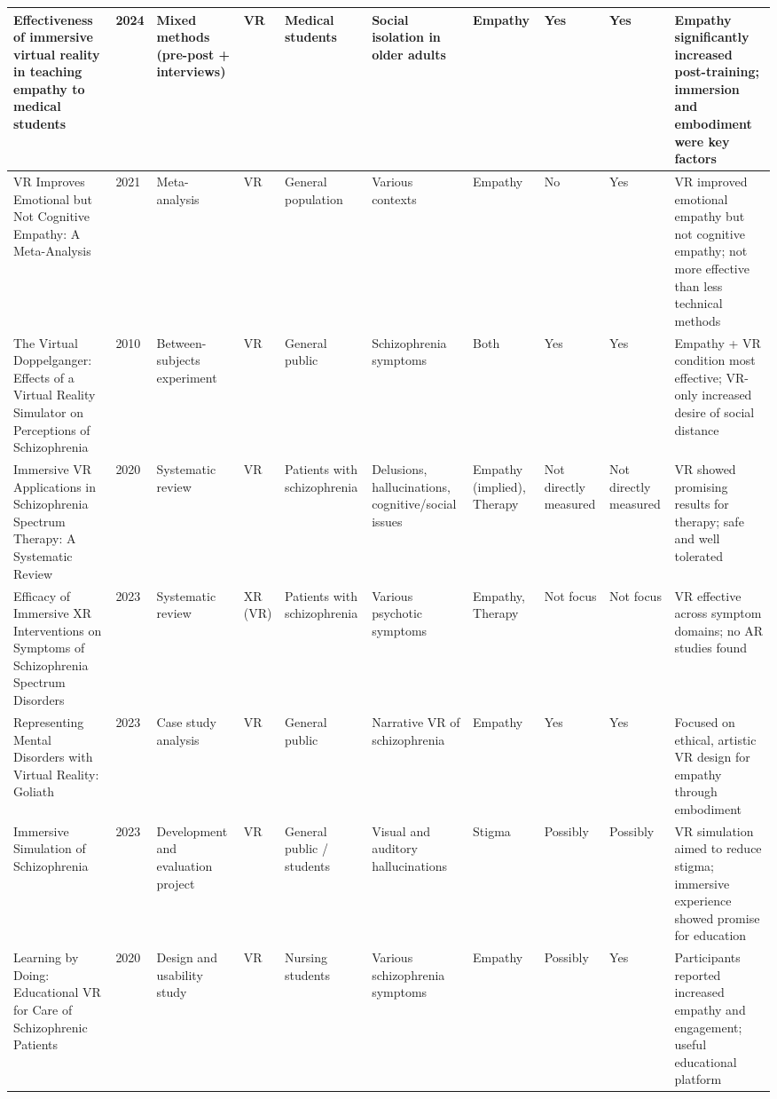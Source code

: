 \begin{landscape}
\begin{longtable}{|P{2.8cm}|P{0.6cm}|P{1.8cm}|P{1.2cm}|P{1.2cm}|P{2cm}|P{1.2cm}|P{1.2cm}|P{1.2cm}|P{3cm}|}
    \hline
    Effectiveness of immersive virtual reality in teaching empathy to medical students & 2024 & Mixed methods (pre-post + interviews) & VR & Medical students & Social isolation in older adults & Empathy & Yes & Yes & Empathy significantly increased post-training; immersion and embodiment were key factors \\
    \hline
    VR Improves Emotional but Not Cognitive Empathy: A Meta-Analysis & 2021 & Meta-analysis & VR & General population & Various contexts & Empathy & No & Yes & VR improved emotional empathy but not cognitive empathy; not more effective than less technical methods \\
    \hline
    The Virtual Doppelganger: Effects of a Virtual Reality Simulator on Perceptions of Schizophrenia & 2010 & Between-subjects experiment & VR & General public & Schizophrenia symptoms & Both & Yes & Yes & Empathy + VR condition most effective; VR-only increased desire of social distance \\
    \hline
    Immersive VR Applications in Schizophrenia Spectrum Therapy: A Systematic Review & 2020 & Systematic review & VR & Patients with schizophrenia  & Delusions, hallucinations, cognitive/social issues & Empathy (implied), Therapy & Not directly measured & Not directly measured & VR showed promising results for therapy; safe and well tolerated \\
    \hline
    Efficacy of Immersive XR Interventions on Symptoms of Schizophrenia Spectrum Disorders & 2023 & Systematic review & XR (VR) & Patients with schizophrenia & Various psychotic symptoms & Empathy, Therapy & Not focus & Not focus & VR effective across symptom domains; no AR studies found \\
    \hline
    Representing Mental Disorders with Virtual Reality: Goliath & 2023 & Case study analysis & VR & General public & Narrative VR of schizophrenia & Empathy & Yes & Yes & Focused on ethical, artistic VR design for empathy through embodiment \\
    \hline
    Immersive Simulation of Schizophrenia & 2023 & Development and evaluation project & VR & General public / students & Visual and auditory hallucinations & Stigma & Possibly & Possibly & VR simulation aimed to reduce stigma; immersive experience showed promise for education \\
    \hline
    Learning by Doing: Educational VR for Care of Schizophrenic Patients & 2020 & Design and usability study & VR  & Nursing students & Various schizophrenia symptoms & Empathy & Possibly & Yes & Participants reported increased empathy and engagement; useful educational platform \\

\end{longtable}
\end{landscape}
